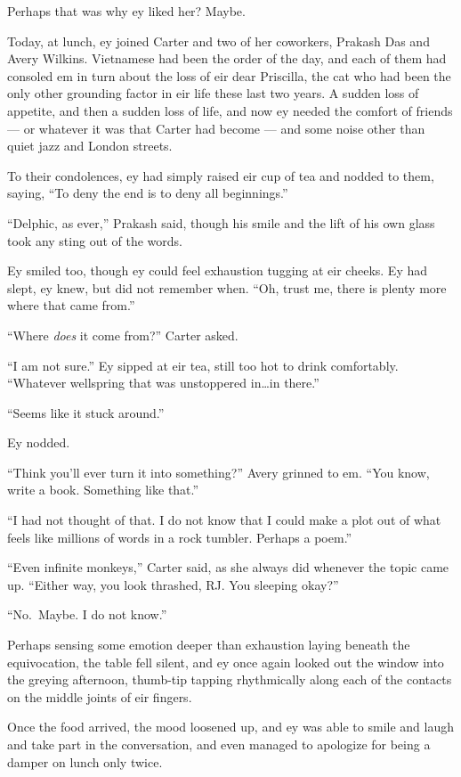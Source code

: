 Perhaps that was why ey liked her? Maybe.

Today, at lunch, ey joined Carter and two of her coworkers, Prakash Das and Avery Wilkins. Vietnamese had been the order of the day, and each of them had consoled em in turn about the loss of eir dear Priscilla, the cat who had been the only other grounding factor in eir life these last two years. A sudden loss of appetite, and then a sudden loss of life, and now ey needed the comfort of friends — or whatever it was that Carter had become — and some noise other than quiet jazz and London streets.

To their condolences, ey had simply raised eir cup of tea and nodded to them, saying, ``To deny the end is to deny all beginnings.''

``Delphic, as ever,'' Prakash said, though his smile and the lift of his own glass took any sting out of the words.

Ey smiled too, though ey could feel exhaustion tugging at eir cheeks. Ey had slept, ey knew, but did not remember when. ``Oh, trust me, there is plenty more where that came from.''

``Where \emph{does} it come from?'' Carter asked.

``I am not sure.'' Ey sipped at eir tea, still too hot to drink comfortably. ``Whatever wellspring that was unstoppered in\ldots in there.''

``Seems like it stuck around.''

Ey nodded.

``Think you'll ever turn it into something?'' Avery grinned to em. ``You know, write a book. Something like that.''

``I had not thought of that. I do not know that I could make a plot out of what feels like millions of words in a rock tumbler. Perhaps a poem.''

``Even infinite monkeys,'' Carter said, as she always did whenever the topic came up. ``Either way, you look thrashed, RJ. You sleeping okay?''

``No.~Maybe. I do not know.''

Perhaps sensing some emotion deeper than exhaustion laying beneath the equivocation, the table fell silent, and ey once again looked out the window into the greying afternoon, thumb-tip tapping rhythmically along each of the contacts on the middle joints of eir fingers.

Once the food arrived, the mood loosened up, and ey was able to smile and laugh and take part in the conversation, and even managed to apologize for being a damper on lunch only twice.

